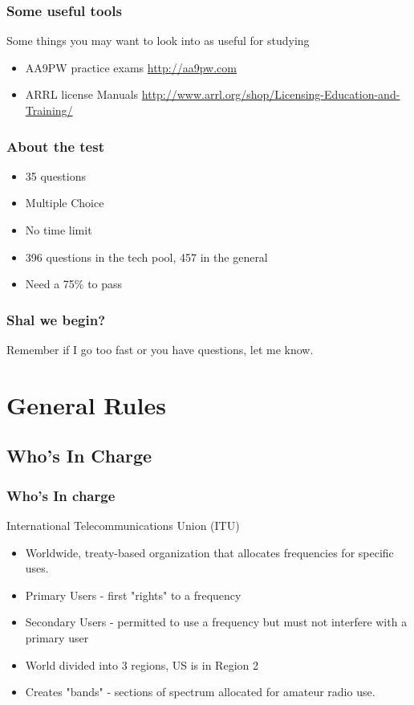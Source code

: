 \documentclass[12pt]{beamer}
\begin{document}
\begin{frame}
\frametitle{Some useful tools}
Some things you may want to look into as useful for studying
\begin{itemize}
\item AA9PW practice exams \url{http://aa9pw.com}
\item ARRL license Manuals \url{http://www.arrl.org/shop/Licensing-Education-and-Training/}
\end{itemize}
\end{frame}

\begin{frame}
\frametitle{About the test}
\begin{itemize}
\item 35 questions \pause
\item Multiple Choice \pause
\item No time limit \pause
\item 396 questions in the tech pool, 457 in the general \pause
\item Need a 75\% to pass
\end{itemize}
\end{frame}

\begin{frame}
\frametitle{Shal we begin?}
Remember if I go too fast or you have questions, let me know.
\end{frame}

\section{General Rules}
\subsection{Who's In Charge}
\begin{frame}
\frametitle{Who's In charge}
International Telecommunications Union (ITU)
\begin{itemize}
\item Worldwide, treaty-based organization that allocates frequencies for specific uses.
\item Primary Users - first "rights" to a frequency
\item Secondary Users - permitted to use a frequency but must not interfere with a primary user
\item World divided into 3 regions, US is in Region 2
\item Creates "bands" - sections of spectrum allocated for amateur radio use.
\end{itemize}
\end{frame}
\end{document}
